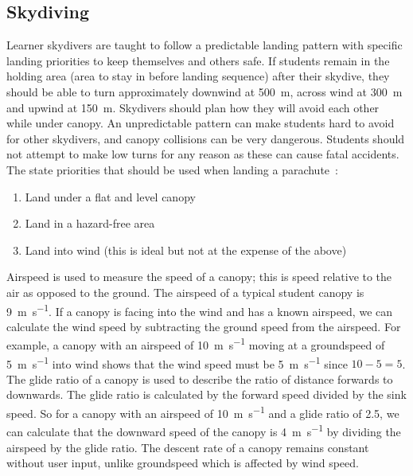 \documentclass[11pt, a4paper, twocolumn]{article}
\begin{document}
\subsection{Skydiving}
Learner skydivers are taught to follow a predictable landing pattern with specific landing priorities to keep themselves and others safe. If students remain in the holding area (area to stay in before landing sequence) after their skydive, they should be able to turn approximately downwind at \SI{500}{\metre}, across wind at \SI{300}{\metre} and upwind at \SI{150}{\metre}. Skydivers should plan how they will avoid each other while under canopy. An unpredictable pattern can make students hard to avoid for other skydivers, and canopy collisions can be very dangerous. Students should not attempt to make low turns for any reason as these can cause fatal accidents. The \citeauthor{british_parachute_association_chmanual.pdf_nodate} state priorities that should be used when landing a parachute~\cite{british_parachute_association_chmanual.pdf_nodate}:

\begin{enumerate}
    \item Land under a flat and level canopy
    \item Land in a hazard-free area
    \item Land into wind (this is ideal but not at the expense of the above)
\end{enumerate}


Airspeed is used to measure the speed of a canopy; this is speed relative to the air as opposed to the ground. The airspeed of a typical student canopy is \SI{9}{\metre\per\second}. If a canopy is facing into the wind and has a known airspeed, we can calculate the wind speed by subtracting the ground speed from the airspeed. For example, a canopy with an airspeed of \SI{10}{\metre\per\second} moving at a groundspeed of \SI{5}{\metre\per\second} into wind shows that the wind speed must be \SI{5}{\metre\per\second} since $10 - 5 = 5$.
The glide ratio of a canopy is used to describe the ratio of distance forwards to downwards. The glide ratio is calculated by the forward speed divided by the sink speed. So for a canopy with an airspeed of \SI{10}{\metre\per\second} and a glide ratio of 2.5, we can calculate that the downward speed of the canopy is \SI{4}{\metre\per\second} by dividing the airspeed by the glide ratio. The descent rate of a canopy remains constant without user input, unlike groundspeed which is affected by wind speed.
\end{document}
